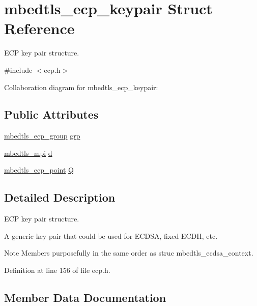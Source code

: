 \hypertarget{structmbedtls__ecp__keypair}{}\section{mbedtls\+\_\+ecp\+\_\+keypair Struct Reference}
\label{structmbedtls__ecp__keypair}


E\+CP key pair structure.  




{\ttfamily \#include $<$ecp.\+h$>$}



Collaboration diagram for mbedtls\+\_\+ecp\+\_\+keypair\+:
\subsection*{Public Attributes}
\begin{DoxyCompactItemize}
\item 
\mbox{\hyperlink{structmbedtls__ecp__group}{mbedtls\+\_\+ecp\+\_\+group}} \mbox{\hyperlink{structmbedtls__ecp__keypair_ab5b77c1c63b7396b6869545b121d8828}{grp}}
\item 
\mbox{\hyperlink{structmbedtls__mpi}{mbedtls\+\_\+mpi}} \mbox{\hyperlink{structmbedtls__ecp__keypair_aa3d38ffe795a2953fb283644845087d6}{d}}
\item 
\mbox{\hyperlink{structmbedtls__ecp__point}{mbedtls\+\_\+ecp\+\_\+point}} \mbox{\hyperlink{structmbedtls__ecp__keypair_a30cb41708701bb9ed9bdba5972a2ccea}{Q}}
\end{DoxyCompactItemize}


\subsection{Detailed Description}
E\+CP key pair structure. 

A generic key pair that could be used for E\+C\+D\+SA, fixed E\+C\+DH, etc.

\begin{DoxyNote}{Note}
Members purposefully in the same order as struc mbedtls\+\_\+ecdsa\+\_\+context. 
\end{DoxyNote}


Definition at line 156 of file ecp.\+h.



\subsection{Member Data Documentation}
\mbox{\label{structmbedtls__ecp__keypair_aa3d38ffe795a2953fb283644845087d6}} 
